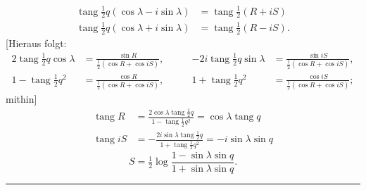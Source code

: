 \noindent [so wird]
\[
\begin{aligned}
\operatorname{tang}\tfrac12 q(\cos\lambda-i\sin\lambda)&=\operatorname{tang}\tfrac12(R+iS)\\
\operatorname{tang}\tfrac12 q(\cos\lambda+i\sin\lambda)&=\operatorname{tang}\tfrac12(R-iS).
\end{aligned}
\]
[Hieraus folgt:
\[
\begin{alignedat}{2}
2\operatorname{tang}\tfrac12 q\cos\lambda&=\frac{\sin R}{\tfrac12(\cos R+\cos iS)},\qquad&
-2i\operatorname{tang}\tfrac12 q\sin\lambda&=\frac{\sin iS}{\tfrac12(\cos R+\cos iS)},\\
1-\operatorname{tang}\tfrac12 q^2&=\frac{\cos R}{\tfrac12(\cos R+\cos iS)},&
1+\operatorname{tang}\tfrac12 q^2&=\frac{\cos iS}{\tfrac12(\cos R+\cos iS)};
\end{alignedat}
\]
\noindent mithin]
\[
\begin{aligned}
\operatorname{tang} R&=\frac{2\cos\lambda\operatorname{tang}\tfrac12 q}{1-\operatorname{tang}\tfrac12 q^2}
=\cos\lambda\operatorname{tang} q\\
\operatorname{tang} iS&=-\frac{2i\sin\lambda\operatorname{tang}\tfrac12 q}{1+\operatorname{tang}\tfrac12 q^2}
=-i\sin\lambda\sin q
\end{aligned}
\]
\noindent [oder]
\[
S=\tfrac12\log\frac{1-\sin\lambda\sin q}{1+\sin\lambda\sin q}.
\]
\begin{center}\rule{.18\linewidth}{.4pt}\end{center}
\small
\setlength{\abovedisplayskip}{5pt}
\setlength{\belowdisplayskip}{5pt}
\setlength{\abovedisplayshortskip}{3pt}
\setlength{\belowdisplayshortskip}{3pt}

\par\clearpage

